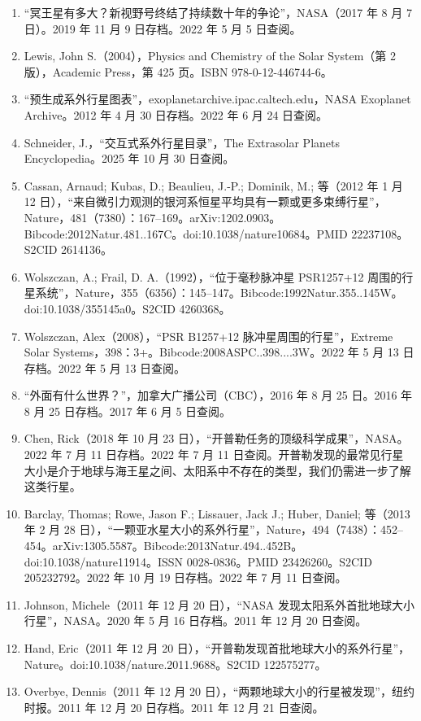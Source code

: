 \begin{enumerate}
\item “冥王星有多大？新视野号终结了持续数十年的争论”，NASA（2017 年 8 月 7 日）。2019 年 11 月 9 日存档。2022 年 5 月 5 日查阅。
\item Lewis, John S.（2004），Physics and Chemistry of the Solar System（第 2 版），Academic Press，第 425 页。ISBN 978-0-12-446744-6。
\item “预生成系外行星图表”，exoplanetarchive.ipac.caltech.edu，NASA Exoplanet Archive。2012 年 4 月 30 日存档。2022 年 6 月 24 日查阅。
\item Schneider, J.，“交互式系外行星目录”，The Extrasolar Planets Encyclopedia。2025 年 10 月 30 日查阅。
\item Cassan, Arnaud; Kubas, D.; Beaulieu, J.-P.; Dominik, M.; 等（2012 年 1 月 12 日），“来自微引力观测的银河系恒星平均具有一颗或更多束缚行星”，Nature，481（7380）：167–169。arXiv:1202.0903。Bibcode:2012Natur.481..167C。doi:10.1038/nature10684。PMID 22237108。S2CID 2614136。
\item Wolszczan, A.; Frail, D. A.（1992），“位于毫秒脉冲星 PSR1257+12 周围的行星系统”，Nature，355（6356）：145–147。Bibcode:1992Natur.355..145W。doi:10.1038/355145a0。S2CID 4260368。
\item Wolszczan, Alex（2008），“PSR B1257+12 脉冲星周围的行星”，Extreme Solar Systems，398：3+。Bibcode:2008ASPC..398....3W。2022 年 5 月 13 日存档。2022 年 5 月 13 日查阅。
\item “外面有什么世界？”，加拿大广播公司（CBC），2016 年 8 月 25 日。2016 年 8 月 25 日存档。2017 年 6 月 5 日查阅。
\item Chen, Rick（2018 年 10 月 23 日），“开普勒任务的顶级科学成果”，NASA。2022 年 7 月 11 日存档。2022 年 7 月 11 日查阅。开普勒发现的最常见行星大小是介于地球与海王星之间、太阳系中不存在的类型，我们仍需进一步了解这类行星。
\item Barclay, Thomas; Rowe, Jason F.; Lissauer, Jack J.; Huber, Daniel; 等（2013 年 2 月 28 日），“一颗亚水星大小的系外行星”，Nature，494（7438）：452–454。arXiv:1305.5587。Bibcode:2013Natur.494..452B。doi:10.1038/nature11914。ISSN 0028-0836。PMID 23426260。S2CID 205232792。2022 年 10 月 19 日存档。2022 年 7 月 11 日查阅。
\item Johnson, Michele（2011 年 12 月 20 日），“NASA 发现太阳系外首批地球大小行星”，NASA。2020 年 5 月 16 日存档。2011 年 12 月 20 日查阅。
\item Hand, Eric（2011 年 12 月 20 日），“开普勒发现首批地球大小的系外行星”，Nature。doi:10.1038/nature.2011.9688。S2CID 122575277。
\item Overbye, Dennis（2011 年 12 月 20 日），“两颗地球大小的行星被发现”，纽约时报。2011 年 12 月 20 日存档。2011 年 12 月 21 日查阅。

\end{enumerate}
